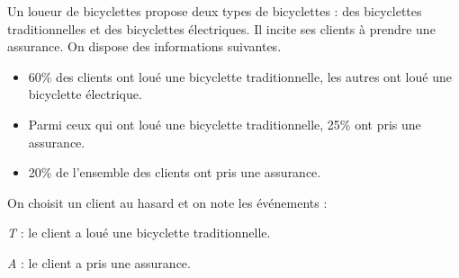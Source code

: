 Un loueur de bicyclettes propose deux types de bicyclettes : des bicyclettes traditionnelles et des bicyclettes électriques. Il incite ses clients à prendre une assurance. On dispose des informations suivantes.
\begin{itemize}[label=$\bullet$]
	\item 60\% des clients ont loué une bicyclette traditionnelle, les autres ont loué une bicyclette électrique.
	\item Parmi ceux qui ont loué une bicyclette traditionnelle, 25\% ont pris une assurance.
	\item 20\% de l'ensemble des clients ont pris une assurance.
\end{itemize}

On choisit un client au hasard et on note les événements :

\textit{T} : \og{}le client a loué une bicyclette traditionnelle\fg{}.

\textit{A} : \og{}le client a pris une assurance\fg{}.

